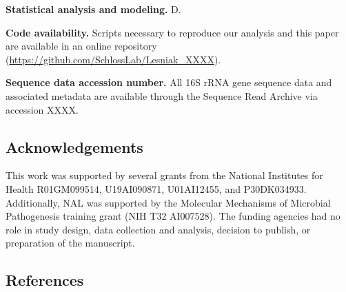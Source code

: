 \documentclass[
  12pt,
]{article}
\begin{document}
\textbf{Statistical analysis and modeling.} D.

\textbf{Code availability.} Scripts necessary to reproduce our analysis
and this paper are available in an online repository
(\url{https://github.com/SchlossLab/Lesniak_XXXX}).

\textbf{Sequence data accession number.} All 16S rRNA gene sequence data
and associated metadata are available through the Sequence Read Archive
via accession XXXX.

\hypertarget{acknowledgements}{%
\subsection{Acknowledgements}\label{acknowledgements}}

This work was supported by several grants from the National Institutes
for Health R01GM099514, U19AI090871, U01AI12455, and P30DK034933.
Additionally, NAL was supported by the Molecular Mechanisms of Microbial
Pathogenesis training grant (NIH T32 AI007528). The funding agencies had
no role in study design, data collection and analysis, decision to
publish, or preparation of the manuscript.

\newpage

\hypertarget{references}{%
\subsection{References}\label{references}}
\end{document}
